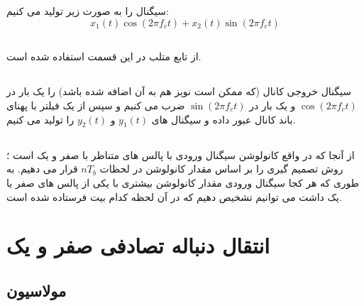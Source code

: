 \documentclass[a4paper]{article}
\begin{document}
	\subsection{}
	سیگنال  را به صورت زیر تولید می کنیم:
	\begin{equation*}
		x_1(t) \cos(2 \pi f_c t) + x_2(t) \sin(2 \pi f_c t)
	\end{equation*} 
	\subsection{}
	از تابع  متلب در این قسمت استفاده شده است.
	\subsection{}
	سیگنال خروجی کانال (که ممکن است نویز هم به آن اضافه شده باشد) را یک بار در 
	$\cos (2 \pi f_c t)$
	و یک بار در 
	$\sin (2 \pi f_c t)$
	 ضرب می کنیم و سپس از یک فیلتر  با پهنای باند کانال عبور داده و سیگنال های 
	 $y_1(t)$
	 و 
	 $y_2(t)$
	 را تولید می کنیم.
	 \subsection{}
	 از آنجا که  در واقع کانولوشن سیگنال ورودی با پالس های متناظر با صفر و یک است ؛ روش تصمیم گیری را بر اساس مقدار کانولوشن در لحظات 
	 $nT_b$
	 قرار می دهیم. به طوری که هر کجا سیگنال ورودی مقدار کانولوشن بیشتری با یکی از پالس های صفر یا یک داشت می توانیم تشخیص دهیم که در آن لحظه کدام بیت فرستاده شده است.
\section{انتقال دنباله تصادفی صفر و یک}
\subsection{مولاسیون }
\end{document}
